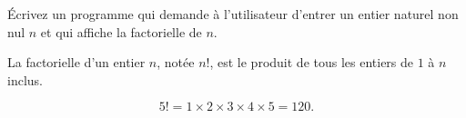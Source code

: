 \begin{exo}{}
	Écrivez un programme qui demande à l'utilisateur d'entrer un entier naturel non nul $n$ et qui affiche la factorielle de $n$.

	La factorielle d'un entier $n$, notée $n!$, est le produit de tous les entiers de $1$ à $n$ inclus.

	\[
		5! = 1 \times 2 \times 3 \times 4 \times 5 = 120.
	\]
\end{exo}
